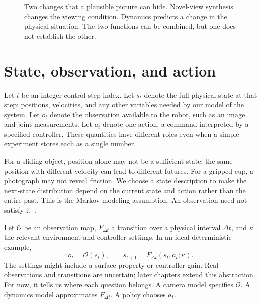 \begin{figure}[htbp]\centering
{}
\caption{Two changes that a plausible picture can hide. Novel-view synthesis changes the viewing condition. Dynamics predicts a change in the physical situation. The two functions can be combined, but one does not establish the other.}
\label{fig:graphics-transition}
\end{figure}

\section{State, observation, and action}
Let $t$ be an integer control-step index. Let $s_t$ denote the full physical state at that step: positions, velocities, and any other variables needed by our model of the system. Let $o_t$ denote the observation available to the robot, such as an image and joint measurements. Let $a_t$ denote one action, a command interpreted by a specified controller. These quantities have different roles even when a simple experiment stores each as a single number.

For a sliding object, position alone may not be a sufficient state: the same position with different velocity can lead to different futures. For a gripped cup, a photograph may not reveal friction. We choose a state description to make the next-state distribution depend on the current state and action rather than the entire past. This is the Markov modeling assumption. An observation need not satisfy it~\citep{suttonbarto}.

Let $\mathcal O$ be an observation map, $F_{\Delta t}$ a transition over a physical interval $\Delta t$, and $\kappa$ the relevant environment and controller settings. In an ideal deterministic example,
\begin{equation}
 o_t=\mathcal O(s_t),\qquad s_{t+1}=F_{\Delta t}(s_t,a_t;\kappa).
 \label{eq:foundation-transition}
\end{equation}
The settings might include a surface property or controller gain. Real observations and transitions are uncertain; later chapters extend this abstraction. For now, it tells us where each question belongs. A camera model specifies $\mathcal O$. A dynamics model approximates $F_{\Delta t}$. A policy chooses $a_t$.

